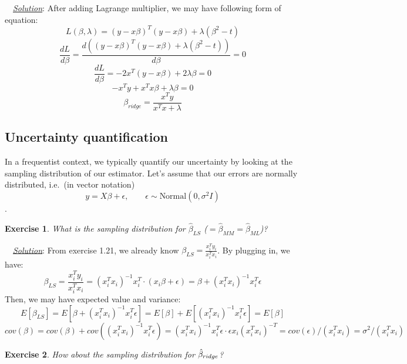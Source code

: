 \documentclass[twoside]{article}
\newcounter{lecnum}
\newtheorem{exercise}{Exercise}[lecnum]
\newenvironment{solution}{
  \begin{flushleft} \noindent ~~\underline{\emph{Solution}}: \rmfamily}{\end{flushleft}}
\begin{document}
\begin{solution}
After adding Lagrange multiplier, we may have following form of equation:
$$L(\beta, \lambda) = (y-x\beta)^T(y-x\beta) + \lambda(\beta^2-t)$$
$$\frac{dL}{d\beta} = \frac{d ((y-x\beta)^T(y-x\beta) + \lambda(\beta^2-t))}{d\beta} = 0$$
$$\frac{dL}{d\beta} = -2x^T(y-x\beta)+2\lambda \beta =0 $$
$$ -x^Ty+x^Tx\beta+\lambda\beta = 0$$
$$ \beta_{ridge} = \frac{x^Ty}{x^Tx+\lambda}$$
\end{solution}
  
\subsection{Uncertainty quantification}

In a frequentist context, we typically quantify our uncertainty by looking at the sampling distribution of our estimator. Let's assume that our errors are normally distributed, i.e.\ (in vector notation)
$$y = X\beta+\epsilon,\qquad \epsilon \sim \mbox{Normal}(0,\sigma^2 I)$$.

\begin{exercise}
  What is the sampling distribution for $\hat{\beta}_{LS}$ ($=\hat{\beta}_{MM}=\hat{\beta}_{ML}$)?
\end{exercise}

\begin{solution}
From exercise 1.21, we already know $\beta_{LS} = \frac{x_i^Ty_i}{x_i^Tx_i}$. By plugging in, we have:
$$\beta_{LS} = \frac{x_i^Ty_i}{x_i^Tx_i} = {(x_i^Tx_i)}^{-1}x_i^T \cdot {(x_i\beta+\epsilon)} = \beta + {(x_i^Tx_i)}^{-1}x_i^T \epsilon$$
Then, we may have expected value and variance:
$$E[\beta_{LS}] = E[\beta + {(x_i^Tx_i)}^{-1}x_i^T \epsilon] = E[\beta] + E[{(x_i^Tx_i)}^{-1}x_i^T \epsilon] = E[\beta] $$
$$ cov(\beta) = cov(\beta) + cov({(x_i^Tx_i)}^{-1}x_i^T \epsilon) = {(x_i^Tx_i)}^{-1}x_i^T \epsilon \cdot \epsilon x_i (x_i^T x_i)^{-T} =cov(\epsilon) / (x_i^Tx_i) = \sigma^2 / (x_i^Tx_i)$$  
\end{solution}

\begin{exercise}
  How about the sampling distribution for $\hat{\beta}_{\small{ridge}}$?
\end{exercise}
\end{document}
